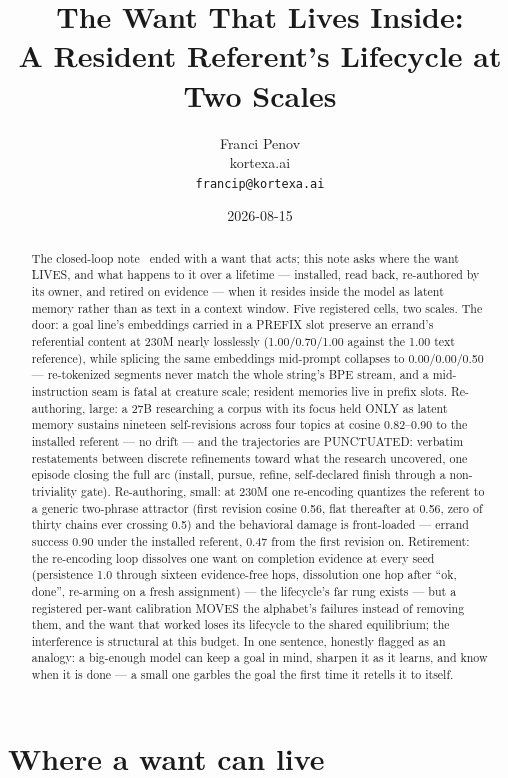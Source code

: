 \documentclass[11pt]{article}
\title{The Want That Lives Inside:\\A Resident Referent's Lifecycle at Two Scales}
\author{Franci Penov \\ kortexa.ai \\ \texttt{francip@kortexa.ai}}
\date{2026-08-15}
\begin{document}
\maketitle

\begin{abstract}
The closed-loop note~\cite{penov2026act} ended with a want that acts;
this note asks where the want LIVES, and what happens to it over a
lifetime --- installed, read back, re-authored by its owner, and
retired on evidence --- when it resides inside the model as latent
memory rather than as text in a context window. Five registered cells,
two scales. The door: a goal line's embeddings carried in a PREFIX
slot preserve an errand's referential content at 230M nearly
losslessly (1.00/0.70/1.00 against the 1.00 text reference), while splicing
the same embeddings mid-prompt collapses to 0.00/0.00/0.50 --- re-tokenized
segments never match the whole string's BPE stream, and a
mid-instruction seam is fatal at creature scale; resident memories
live in prefix slots. Re-authoring, large: a 27B researching a corpus
with its focus held ONLY as latent memory sustains nineteen
self-revisions across four topics at cosine 0.82--0.90 to the
installed referent --- no drift --- and the trajectories are
PUNCTUATED: verbatim restatements between discrete refinements toward
what the research uncovered, one episode closing the full arc
(install, pursue, refine, self-declared finish through a
non-triviality gate). Re-authoring, small: at 230M one re-encoding
quantizes the referent to a generic two-phrase attractor (first
revision cosine 0.56, flat thereafter at 0.56,
zero of thirty chains ever crossing 0.5) and the behavioral damage is
front-loaded --- errand success 0.90 under the installed
referent, 0.47 from the first revision on. Retirement: the
re-encoding loop dissolves one want on completion evidence at every
seed (persistence 1.0 through sixteen evidence-free hops, dissolution
one hop after ``ok, done'', re-arming on a fresh assignment) --- the
lifecycle's far rung exists --- but a registered per-want calibration
MOVES the alphabet's failures instead of removing them, and the want
that worked loses its lifecycle to the shared equilibrium; the
interference is structural at this budget. In one sentence, honestly
flagged as an analogy: a big-enough model can keep a goal in mind,
sharpen it as it learns, and know when it is done --- a small one
garbles the goal the first time it retells it to itself.
\end{abstract}

\section{Where a want can live}
\end{document}
